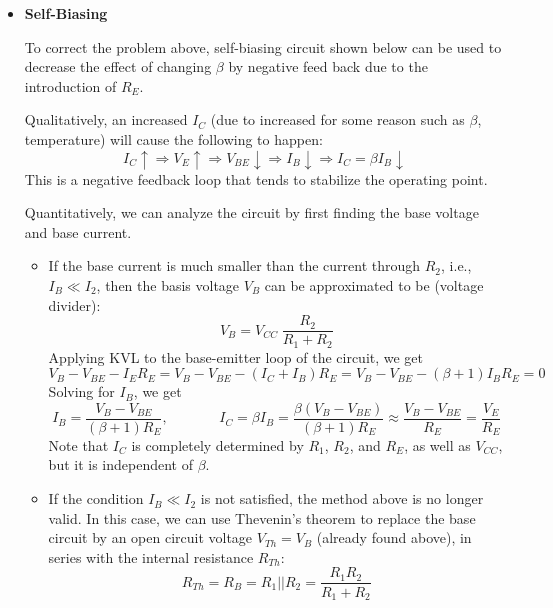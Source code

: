 \begin{itemize}
\item {\bf Self-Biasing} 

To correct the problem above, self-biasing circuit shown below can be
used to decrease the effect of changing $\beta$ by negative feed back
due to the introduction of $R_E$.


Qualitatively, an increased $I_C$ (due to increased for some reason
such as $\beta$, temperature) will cause the following to happen:
\[
I_C \uparrow \Longrightarrow V_E \uparrow \Longrightarrow V_{BE} 
\downarrow \Longrightarrow I_B \downarrow \Longrightarrow 
I_C=\beta I_B \downarrow	
\]
This is a negative feedback loop that tends to stabilize the operating
point.

Quantitatively, we can analyze the circuit by first finding the base 
voltage and base current. 
\begin{itemize}
\item If the base current is much smaller than the current through 
  $R_2$, i.e., $I_B \ll I_2$, then the basis voltage $V_B$ can be
  approximated to be (voltage divider):
  \[
  V_B = V_{CC} \;\frac{R_2}{R_1+R_2}	
  \]
  Applying KVL to the base-emitter loop of the circuit, we get
  \[
  V_B-V_{BE}-I_ER_E=V_B-V_{BE}-(I_C+I_B)R_E=V_B-V_{BE}-(\beta+1)I_BR_E=0 
  \]
  Solving for $I_B$, we get
  \[ 
  I_B=\frac{V_B-V_{BE}}{(\beta+1)R_E},\;\;\;\;\;\;\;\;\;\;\;\;\;
  I_C=\beta I_B=\frac{\beta(V_B-V_{BE})}{(\beta+1)R_E}
  \approx \frac{V_B-V_{BE}}{R_E} =\frac{V_E}{R_E} 
  \]
  Note that $I_C$ is completely determined by $R_1$, $R_2$, and $R_E$, 
  as well as $V_{CC}$, but it is independent of $\beta$.

\item If the condition $I_B \ll I_2$ is not satisfied, the method above 
  is no longer valid. In this case, we can use Thevenin's theorem to replace 
  the base circuit by an open circuit voltage $V_{Th}=V_B$ (already found 
  above), in series with the internal resistance $R_{Th}$:
  \[
  R_{Th}=R_B=R_1||R_2=\frac{R_1R_2}{R_1+R_2}	
  \]



\end{itemize}
\end{itemize}
